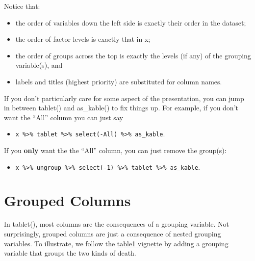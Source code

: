 \documentclass[]{article}
\providecommand{\tightlist}{%
  \setlength{\itemsep}{0pt}\setlength{\parskip}{0pt}}
\begin{document}
Notice that:

\begin{itemize}
\tightlist
\item
  the order of variables down the left side is exactly their order in
  the dataset;
\item
  the order of factor levels is exactly that in x;
\item
  the order of groups across the top is exactly the levels (if any) of
  the grouping variable(s), and
\item
  labels and titles (highest priority) are substituted for column names.
\end{itemize}

If you don't particularly care for some aspect of the presentation, you
can jump in between tablet() and as\_kable() to fix things up. For
example, if you don't want the ``All'' column you can just say

\begin{itemize}
\tightlist
\item
  \texttt{x\ \%\textgreater{}\%\ tablet\ \%\textgreater{}\%\ select(-All)\ \%\textgreater{}\%\ as\_kable}.
\end{itemize}

If you \textbf{only} want the the ``All'' column, you can just remove
the group(s):

\begin{itemize}
\tightlist
\item
  \texttt{x\ \%\textgreater{}\%\ ungroup\ \%\textgreater{}\%\ select(-1)\ \%\textgreater{}\%\ tablet\ \%\textgreater{}\%\ as\_kable}.
\end{itemize}

\hypertarget{grouped-columns}{%
\section{Grouped Columns}\label{grouped-columns}}

In tablet(), most columns are the consequences of a grouping variable.
Not surprisingly, grouped columns are just a consequence of nested
grouping variables. To illustrate, we follow the
\href{https://CRAN.R-project.org/package=table1}{table1 vignette} by
adding a grouping variable that groups the two kinds of death.
\end{document}
